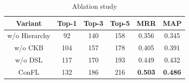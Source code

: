 \vspace{-4pt}
\begin{table}[H]\footnotesize
\caption{Ablation study} \label{table:ablation}
\vspace{-8pt}
\begin{tabular}{c|ccc|cc}
\hline \toprule
Variant & Top-1 & Top-3 & Top-5  & MRR & MAP \\ \hline
w/o Hierarchy  &  92     & 140      &  158 & 0.356   & 0.345     \\ 
w/o CKB    & 104      & 157      & 178     & 0.405   & 0.391   \\ 
w/o DSL    & 117      & 170      & 193     & 0.449   & 0.432     \\ \hline
ConFL     & 132      & 186      & 216    & \textbf{0.503}    & \textbf{0.486}     \\ \bottomrule
\end{tabular}
\end{table}
\vspace{-0.5em}

